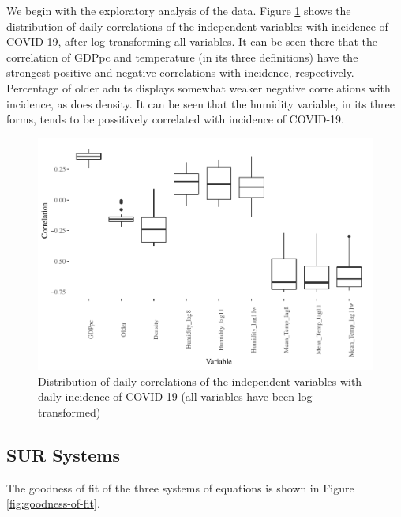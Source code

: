 \documentclass[]{elsarticle} %
\makeatletter
\def\maxwidth{\ifdim\Gin@nat@width>\linewidth\linewidth
\else\Gin@nat@width\fi}
\let\Oldincludegraphics\includegraphics
\renewcommand{\includegraphics}[1]{\Oldincludegraphics[width=\maxwidth]{#1}}
\makeatother
\begin{document}
We begin with the exploratory analysis of the data. Figure
\ref{fig:daily-correlations} shows the distribution of daily
correlations of the independent variables with incidence of COVID-19,
after log-transforming all variables. It can be seen there that the
correlation of GDPpc and temperature (in its three definitions) have the
strongest positive and negative correlations with incidence,
respectively. Percentage of older adults displays somewhat weaker
negative correlations with incidence, as does density. It can be seen
that the humidity variable, in its three forms, tends to be possitively
correlated with incidence of COVID-19.

\begin{figure}
\centering
\includegraphics{Climatic-Correlates-of-COVID19-Spain_files/figure-latex/daily-correlations-1.pdf}
\caption{\label{fig:daily-correlations}Distribution of daily
correlations of the independent variables with daily incidence of
COVID-19 (all variables have been log-transformed)}
\end{figure}

\hypertarget{sur-systems}{%
\subsection{SUR Systems}\label{sur-systems}}

The goodness of fit of the three systems of equations is shown in Figure
\ref{fig:goodness-of-fit}.
\end{document}
